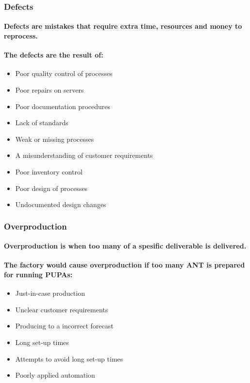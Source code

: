 \documentclass{acm_proc_article-sp}
\begin{document}
\subsubsection{Defects}
\paragraph{Defects are mistakes that require extra time, resources and money to reprocess.}
\paragraph{The defects are the result of:}
\begin{itemize}
\item Poor quality control of processes
\item Poor repairs on servers
\item Poor documentation procedures
\item Lack of standards
\item Weak or missing processes
\item A misunderstanding of customer requirements
\item Poor inventory control
\item Poor design of processes
\item Undocumented design changes
\end{itemize}
\subsubsection{Overproduction}
\paragraph{Overproduction is when too many of a spesific deliverable is delivered.}
\paragraph{The factory would cause overproduction if too many ANT is prepared for running PUPAs:}
\begin{itemize}
\item Just-in-case production
\item Unclear customer requirements
\item Producing to a incorrect forecast
\item Long set-up times
\item Attempts to avoid long set-up times
\item Poorly applied automation 
\end{itemize}
\end{document}
